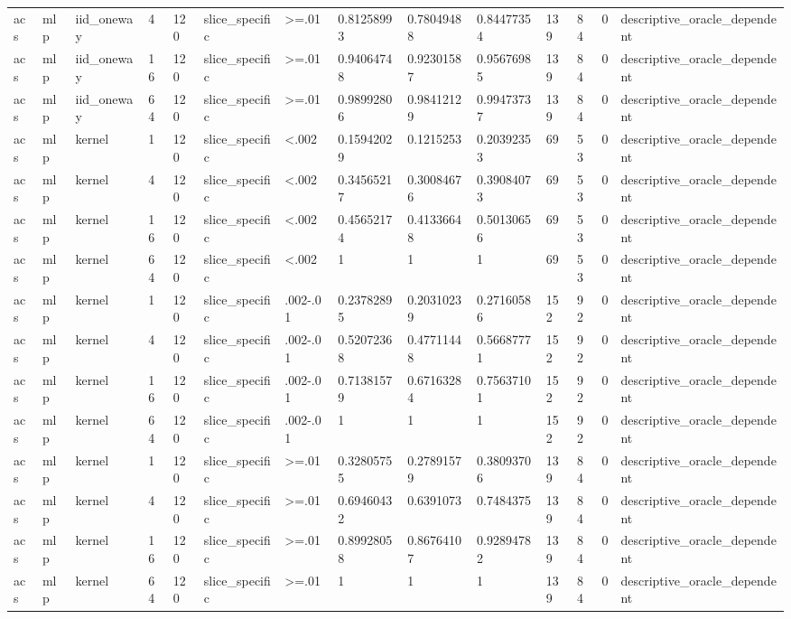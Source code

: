 \begin{tabular}{llllllllllllll}
acs & mlp & iid\_oneway & 4 & 120 & slice\_specific & >=.01 & 0.81258993 & 0.78049488 & 0.84477354 & 139 & 84 & 0 & descriptive\_oracle\_dependent \\
acs & mlp & iid\_oneway & 16 & 120 & slice\_specific & >=.01 & 0.94064748 & 0.92301587 & 0.95676985 & 139 & 84 & 0 & descriptive\_oracle\_dependent \\
acs & mlp & iid\_oneway & 64 & 120 & slice\_specific & >=.01 & 0.98992806 & 0.98412129 & 0.99473737 & 139 & 84 & 0 & descriptive\_oracle\_dependent \\
acs & mlp & kernel & 1 & 120 & slice\_specific & <.002 & 0.15942029 & 0.1215253 & 0.20392353 & 69 & 53 & 0 & descriptive\_oracle\_dependent \\
acs & mlp & kernel & 4 & 120 & slice\_specific & <.002 & 0.34565217 & 0.30084676 & 0.39084073 & 69 & 53 & 0 & descriptive\_oracle\_dependent \\
acs & mlp & kernel & 16 & 120 & slice\_specific & <.002 & 0.45652174 & 0.41336648 & 0.50130656 & 69 & 53 & 0 & descriptive\_oracle\_dependent \\
acs & mlp & kernel & 64 & 120 & slice\_specific & <.002 & 1 & 1 & 1 & 69 & 53 & 0 & descriptive\_oracle\_dependent \\
acs & mlp & kernel & 1 & 120 & slice\_specific & .002-.01 & 0.23782895 & 0.20310239 & 0.27160586 & 152 & 92 & 0 & descriptive\_oracle\_dependent \\
acs & mlp & kernel & 4 & 120 & slice\_specific & .002-.01 & 0.52072368 & 0.47711448 & 0.56687771 & 152 & 92 & 0 & descriptive\_oracle\_dependent \\
acs & mlp & kernel & 16 & 120 & slice\_specific & .002-.01 & 0.71381579 & 0.67163284 & 0.75637101 & 152 & 92 & 0 & descriptive\_oracle\_dependent \\
acs & mlp & kernel & 64 & 120 & slice\_specific & .002-.01 & 1 & 1 & 1 & 152 & 92 & 0 & descriptive\_oracle\_dependent \\
acs & mlp & kernel & 1 & 120 & slice\_specific & >=.01 & 0.32805755 & 0.27891579 & 0.38093706 & 139 & 84 & 0 & descriptive\_oracle\_dependent \\
acs & mlp & kernel & 4 & 120 & slice\_specific & >=.01 & 0.69460432 & 0.6391073 & 0.7484375 & 139 & 84 & 0 & descriptive\_oracle\_dependent \\
acs & mlp & kernel & 16 & 120 & slice\_specific & >=.01 & 0.89928058 & 0.86764107 & 0.92894782 & 139 & 84 & 0 & descriptive\_oracle\_dependent \\
acs & mlp & kernel & 64 & 120 & slice\_specific & >=.01 & 1 & 1 & 1 & 139 & 84 & 0 & descriptive\_oracle\_dependent \\
\bottomrule
\end{tabular}

